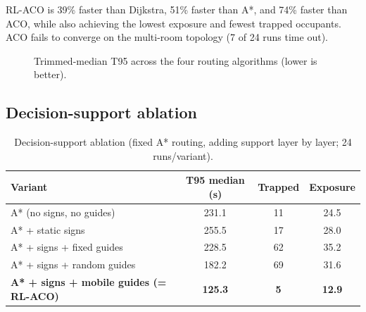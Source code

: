 \documentclass[11pt,a4paper]{article}
\newcommand{\Bar}[3]{%
  \fill[#3] (#1-0.6,0) rectangle (#1+0.6,#2);
  \node[above,font=\scriptsize] at (#1,#2) {#2};
}
\begin{document}
RL-ACO is 39\% faster than Dijkstra, 51\% faster than A*, and 74\% faster than ACO, while also
achieving the lowest exposure and fewest trapped occupants. ACO fails to converge on the
multi-room topology (7 of 24 runs time out).

\begin{figure}[h]
\centering
{}
\caption{Trimmed-median T95 across the four routing algorithms (lower is better).}
\end{figure}

\subsection{Decision-support ablation}

\begin{table}[h]
\centering
\caption{Decision-support ablation (fixed A* routing, adding support layer by layer; 24
runs/variant).}
\begin{tabular}{lccc}
\toprule
Variant & T95 median (s) & Trapped & Exposure \\
\midrule
A* (no signs, no guides) & 231.1 & 11 & 24.5 \\
A* + static signs & 255.5 & 17 & 28.0 \\
A* + signs + fixed guides & 228.5 & 62 & 35.2 \\
A* + signs + random guides & 182.2 & 69 & 31.6 \\
\textbf{A* + signs + mobile guides (= RL-ACO)} & \textbf{125.3} & \textbf{5} & \textbf{12.9} \\
\bottomrule
\end{tabular}
\end{table}
\end{document}
